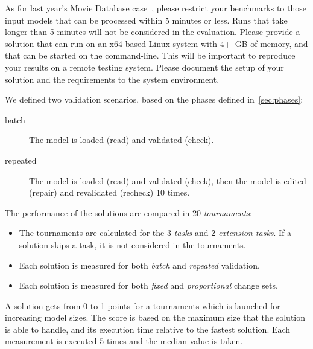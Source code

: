 \documentclass[submission,copyright,creativecommons]{eptcs}
\begin{document}
As for last year's Movie Database case~\cite{horn2014ttc}, please restrict your benchmarks to those input models that can be processed within 5 minutes or less. Runs that take longer than 5 minutes will not be considered in the evaluation. Please provide a solution that can run on an x64-based Linux system with 4+~GB of memory, and that can be started on the command-line. This will be important to reproduce your results on a remote testing system. Please document the setup of your solution and the requirements to the system environment.

We defined two validation scenarios, based on the phases defined in~\autoref{sec:phases}:

\begin{description}
\item[batch] The model is loaded (\textsf{read}) and validated (\textsf{check}).
\item[repeated] The model is loaded (\textsf{read}) and validated (\textsf{check}), then the model is edited (\textsf{repair}) and revalidated (\textsf{recheck}) 10 times.
\end{description}

The performance of the solutions are compared in 20 \emph{tournaments}:

\begin{itemize}
  \item The tournaments are calculated for the 3 \emph{tasks} and 2 \emph{extension tasks}. If a solution skips a task, it is not considered in the tournaments.
  \item Each solution is measured for both \emph{batch} and \emph{repeated} validation.
  \item Each solution is measured for both \emph{fixed} and \emph{proportional} change sets.
\end{itemize}

A solution gets from 0 to 1 points for a tournaments which is launched for increasing model sizes. The score is based on the maximum size that the solution is able to handle, and its execution time relative to the fastest solution. Each measurement is executed 5 times and the median value is taken.
\end{document}
